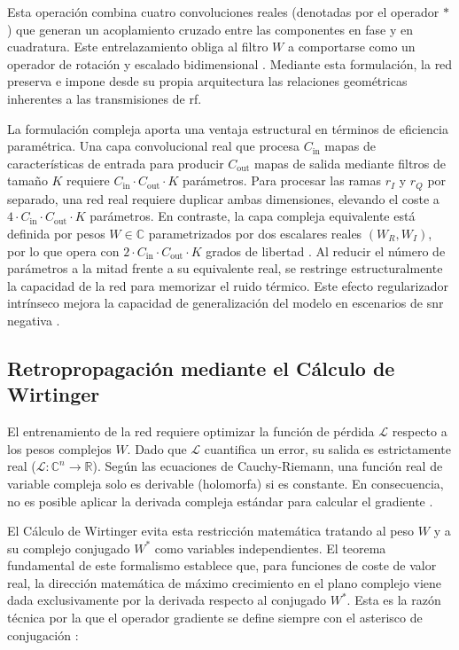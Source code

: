 Esta operación combina cuatro convoluciones reales (denotadas por el operador $\ast$) que generan un acoplamiento cruzado entre las componentes en fase y en cuadratura. Este entrelazamiento obliga al filtro $W$ a comportarse como un operador de rotación y escalado bidimensional \cite{hirose_complex-valued_2012}. Mediante esta formulación, la red preserva e impone desde su propia arquitectura las relaciones geométricas inherentes a las transmisiones de \gls{rf}.

La formulación compleja aporta una ventaja estructural en términos de eficiencia paramétrica. Una capa convolucional real que procesa $C_{\text{in}}$ mapas de características de entrada para producir $C_{\text{out}}$ mapas de salida mediante filtros de tamaño $K$ requiere $C_{\text{in}} \cdot C_{\text{out}} \cdot K$ parámetros. Para procesar las ramas $r_I$ y $r_Q$ por separado, una red real requiere duplicar ambas dimensiones, elevando el coste a $4 \cdot C_{\text{in}} \cdot C_{\text{out}} \cdot K$ parámetros. En contraste, la capa compleja equivalente está definida por pesos $W \in \mathbb{C}$ parametrizados por dos escalares reales $(W_R, W_I)$, por lo que opera con $2 \cdot C_{\text{in}} \cdot C_{\text{out}} \cdot K$ grados de libertad \cite{hirose_complex-valued_2012}. Al reducir el número de parámetros a la mitad frente a su equivalente real, se restringe estructuralmente la capacidad de la red para memorizar el ruido térmico. Este efecto regularizador intrínseco mejora la capacidad de generalización del modelo en escenarios de \gls{snr} negativa \cite{trabelsi_deep_2018, bassey_survey_2021}.

\subsection{Retropropagación mediante el Cálculo de Wirtinger}
El entrenamiento de la red requiere optimizar la función de pérdida $\mathcal{L}$ respecto a los pesos complejos $W$. Dado que $\mathcal{L}$ cuantifica un error, su salida es estrictamente real ($\mathcal{L}: \mathbb{C}^n \rightarrow \mathbb{R}$). Según las ecuaciones de Cauchy-Riemann, una función real de variable compleja solo es derivable (holomorfa) si es constante. En consecuencia, no es posible aplicar la derivada compleja estándar para calcular el gradiente \cite{bouboulis_extension_2011}.

El Cálculo de Wirtinger evita esta restricción matemática tratando al peso $W$ y a su complejo conjugado $W^*$ como variables independientes. El teorema fundamental de este formalismo establece que, para funciones de coste de valor real, la dirección matemática de máximo crecimiento en el plano complejo viene dada exclusivamente por la derivada respecto al conjugado $W^*$. Esta es la razón técnica por la que el operador gradiente se define siempre con el asterisco de conjugación \cite{bouboulis_extension_2011}:

